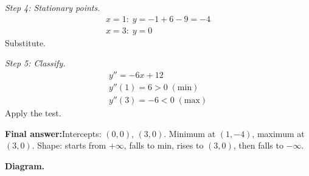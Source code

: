 \documentclass[11pt]{article}
\begin{document}
\textit{Step 4: Stationary points.}
\[\begin{gathered}
x = 1: \; y = -1 + 6 - 9 = -4 \\ x = 3: \; y = 0
\end{gathered}\]
Substitute.

\textit{Step 5: Classify.}
\[\begin{gathered}
y'' = -6x + 12 \\ y''(1) = 6 > 0\; (\text{min}) \\ y''(3) = -6 < 0\; (\text{max})
\end{gathered}\]
Apply the test.

\begin{answerbox}
\textbf{Final answer:}\quad Intercepts: \(\displaystyle  (0, 0) \), \(\displaystyle  (3, 0) \). Minimum at \(\displaystyle  (1, -4) \), maximum at \(\displaystyle  (3, 0) \). Shape: starts from \(\displaystyle  +\infty \), falls to min, rises to \(\displaystyle  (3, 0) \), then falls to \(\displaystyle  -\infty \).
\end{answerbox}
\textbf{Diagram.}
\end{document}
